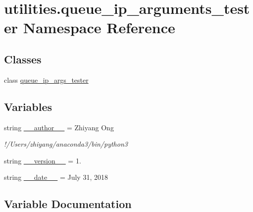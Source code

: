 \hypertarget{namespaceutilities_1_1queue__ip__arguments__tester}{}\section{utilities.\+queue\+\_\+ip\+\_\+arguments\+\_\+tester Namespace Reference}
\label{namespaceutilities_1_1queue__ip__arguments__tester}
\subsection*{Classes}
\begin{DoxyCompactItemize}
\item 
class \hyperlink{classutilities_1_1queue__ip__arguments__tester_1_1queue__ip__args__tester}{queue\+\_\+ip\+\_\+args\+\_\+tester}
\end{DoxyCompactItemize}
\subsection*{Variables}
\begin{DoxyCompactItemize}
\item 
string \hyperlink{namespaceutilities_1_1queue__ip__arguments__tester_a4613e6fdf0e66646ab9e6b2431f60697}{\+\_\+\+\_\+author\+\_\+\+\_\+} = \textquotesingle{}Zhiyang Ong\textquotesingle{}
\begin{DoxyCompactList}\small\item\em !/\+Users/zhiyang/anaconda3/bin/python3 \end{DoxyCompactList}\item 
string \hyperlink{namespaceutilities_1_1queue__ip__arguments__tester_a37d1fc5c2ed863dec0b8ce969bc4ac4c}{\+\_\+\+\_\+version\+\_\+\+\_\+} = \textquotesingle{}1.\textquotesingle{}
\item 
string \hyperlink{namespaceutilities_1_1queue__ip__arguments__tester_abb3d4e36e816d047434e26922c0e28fe}{\+\_\+\+\_\+date\+\_\+\+\_\+} = \textquotesingle{}July 31, 2018\textquotesingle{}
\end{DoxyCompactItemize}


\subsection{Variable Documentation}
\hypertarget{namespaceutilities_1_1queue__ip__arguments__tester_a4613e6fdf0e66646ab9e6b2431f60697}{}
